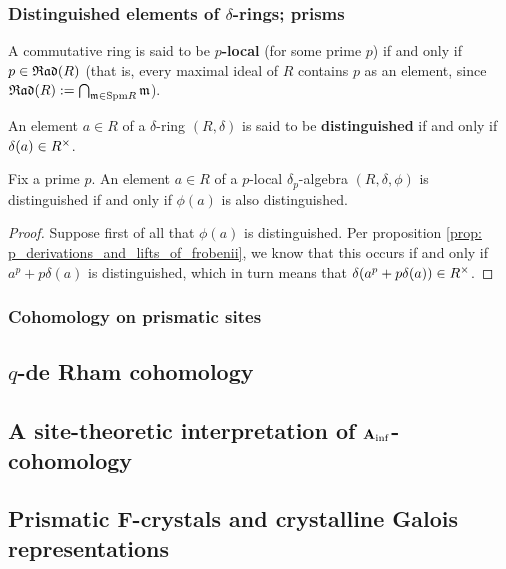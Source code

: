         \subsubsection{Distinguished elements of \texorpdfstring{$\delta$}{}-rings; prisms}
            \begin{definition} \label{def: p_local_rings}
                A commutative ring is said to be \textbf{$p$-local} (for some prime $p$) if and only if $p \in \mathfrak{Rad}(R)$ (that is, every maximal ideal of $R$ contains $p$ as an element, since $\mathfrak{Rad}(R) := \bigcap_{\mathfrak{m} \in \mathrm{Spm} R} \mathfrak{m}$).
            \end{definition}
            \begin{definition} \label{def: distinguished_elements_of_delta_rings}
                An element $a \in R$ of a $\delta$-ring $(R, \delta)$ is said to be \textbf{distinguished} if and only if $\delta(a) \in R^{\x}$.
            \end{definition}
            \begin{proposition} \label{prop: detecting_distinguishness_using_lifts_of_frobenii}
                Fix a prime $p$. An element $a \in R$ of a $p$-local $\delta_p$-algebra $(R, \delta, \phi)$ is distinguished if and only if $\phi(a)$ is also distinguished.
            \end{proposition}
                \begin{proof}
                    Suppose first of all that $\phi(a)$ is distinguished. Per proposition \ref{prop: p_derivations_and_lifts_of_frobenii}, we know that this occurs if and only if $a^p + p\delta(a)$ is distinguished, which in turn means that $\delta(a^p + p\delta(a)) \in R^{\x}$.
                \end{proof}
        
        \subsubsection{Cohomology on prismatic sites}
        
    \subsection{\texorpdfstring{$q$}{}-de Rham cohomology}
    
    \subsection{A site-theoretic interpretation of \texorpdfstring{$\mathbf{A}_{\inf}$}{}-cohomology}
    
    \subsection{Prismatic F-crystals and crystalline Galois representations}